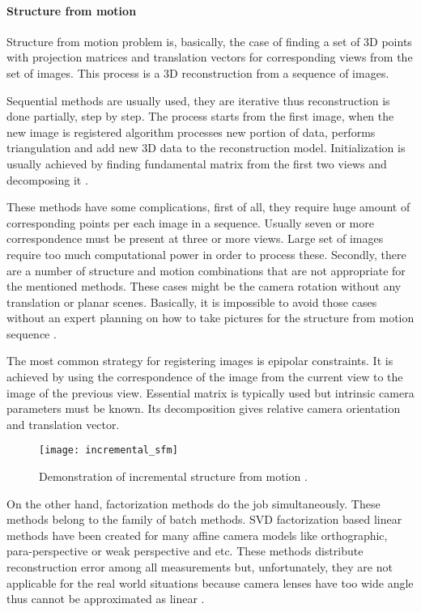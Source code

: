 \documentclass[../../../../main]{subfiles}
\begin{document}
\paragraph{Structure from motion}

Structure from motion problem is, basically, the case of finding a set of 3D points with projection matrices and translation vectors for corresponding views from the set of images. This process is a 3D reconstruction from a sequence of images.

Sequential methods are usually used, they are iterative thus reconstruction is done partially, step by step. The process starts from the first image, when the new image is registered algorithm processes new portion of data, performs triangulation and add new 3D data to the reconstruction model. Initialization is usually achieved by finding fundamental matrix from the first two views and decomposing it \cite{RichardSzeliski2010}.

These methods have some complications, first of all, they require huge amount of corresponding points per each image in a sequence. Usually seven or more correspondence must be present at three or more views. Large set of images require too much computational power in order to process these. Secondly, there are a number of structure and motion combinations that are not appropriate for the mentioned methods. These cases might be the camera rotation without any translation or planar scenes. Basically, it is impossible to avoid those cases without an expert planning on how to take pictures for the structure from motion sequence \cite{sfm_theia}.

The most common strategy for registering images is epipolar constraints. It is achieved by using the correspondence of the image from the current view to the image of the previous view. Essential matrix is typically used but intrinsic camera parameters must be known. Its decomposition gives relative camera orientation and translation vector.

\begin{figure} [ht]
    \begin{center}
        \texttt{[image: incremental\_sfm]}
        \caption{Demonstration of incremental structure from motion \cite{sfm_theia}.}
        \label{fig:incrementalSfm}
    \end{center}
\end{figure}

On the other hand, factorization methods do the job simultaneously. These methods belong to the family of batch methods. \ac{SVD} factorization based linear methods have been created for many affine camera models like orthographic, para-perspective or weak perspective and etc. These methods distribute reconstruction error among all measurements but, unfortunately, they are not applicable for the real world situations because camera lenses have too wide angle thus cannot be approximated as linear \cite{factorization_sfm}.
\end{document}
